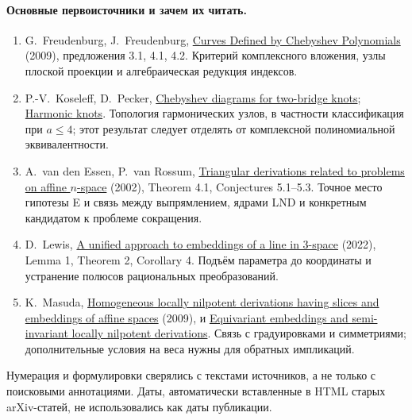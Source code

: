 \paragraph{Основные первоисточники и зачем их читать.}
\begin{enumerate}
\item G.~Freudenburg, J.~Freudenburg,
\href{https://arxiv.org/abs/0902.3440}{Curves Defined by Chebyshev Polynomials}
(2009), предложения 3.1, 4.1, 4.2. Критерий комплексного вложения,
узлы плоской проекции и алгебраическая редукция индексов.
\item P.-V.~Koseleff, D.~Pecker,
\href{https://arxiv.org/abs/0909.3281}{Chebyshev diagrams for two-bridge knots};
\href{https://arxiv.org/abs/1203.4376}{Harmonic knots}.
Топология гармонических узлов, в частности классификация при $a\leq4$;
этот результат следует отделять от комплексной полиномиальной эквивалентности.
\item A.~van den Essen, P.~van Rossum,
\href{https://doi.org/10.1090/S0002-9939-01-06212-8}{Triangular derivations related to problems on affine $n$-space}
(2002), Theorem 4.1, Conjectures 5.1--5.3. Точное место гипотезы E
и связь между выпрямлением, ядрами LND и конкретным кандидатом
к проблеме сокращения.
\item D.~Lewis,
\href{https://arxiv.org/abs/2203.08178}{A unified approach to embeddings of a line in 3-space}
(2022), Lemma 1, Theorem 2, Corollary 4. Подъём параметра до
координаты и устранение полюсов рациональных преобразований.
\item K.~Masuda,
\href{https://doi.org/10.1016/j.jalgebra.2008.12.012}{Homogeneous locally nilpotent derivations having slices and embeddings of affine spaces}
(2009), и
\href{https://sci-tech.ksc.kwansei.ac.jp/~kayo/cmn/papers/eembed.pdf}{Equivariant embeddings and semi-invariant locally nilpotent derivations}.
Связь с градуировками и симметриями; дополнительные условия на веса
нужны для обратных импликаций.
\end{enumerate}
Нумерация и формулировки сверялись с текстами источников, а не только
с поисковыми аннотациями. Даты, автоматически вставленные в HTML
старых arXiv-статей, не использовались как даты публикации.

